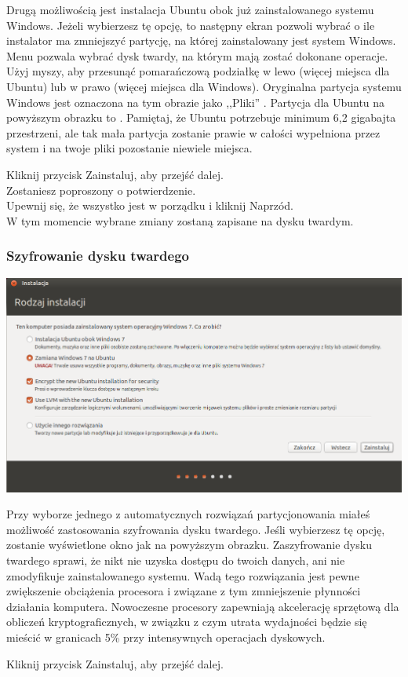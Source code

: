 Drugą możliwością jest instalacja Ubuntu obok już zainstalowanego systemu Windows. Jeżeli wybierzesz tę opcję, to następny ekran pozwoli wybrać o ile instalator ma zmniejszyć partycję, na której zainstalowany jest system Windows. Menu  pozwala wybrać dysk twardy, na którym mają zostać dokonane operacje. Użyj myszy, aby przesunąć pomarańczową podziałkę w lewo (więcej miejsca dla Ubuntu) lub w prawo (więcej miejsca dla Windows). Oryginalna partycja systemu Windows jest oznaczona na tym obrazie jako ,,Pliki'' . Partycja dla Ubuntu na powyższym obrazku to . Pamiętaj, że Ubuntu potrzebuje minimum 6,2 gigabajta przestrzeni, ale tak mała partycja zostanie prawie w całości wypełniona przez system i na twoje pliki pozostanie niewiele miejsca.
\begin{flushright}
Kliknij przycisk \textcolor{ubuntu_orange}{Zainstaluj}, aby przejść dalej.\\
Zostaniesz poproszony o potwierdzenie.\\
Upewnij się, że wszystko jest w porządku i kliknij \textcolor{ubuntu_orange}{Naprzód}.\\
W tym momencie wybrane zmiany zostaną zapisane na dysku twardym.
\end{flushright}

\subsubsection{Szyfrowanie dysku twardego}
\begin{center}
	\includegraphics[width=\linewidth]{images/instalator_partycjonowanie_szyfrowanie1.png}
\end{center}

Przy wyborze jednego z automatycznych rozwiązań partycjonowania miałeś możliwość zastosowania szyfrowania dysku twardego. Jeśli wybierzesz tę opcję, zostanie wyświetlone okno jak na powyższym obrazku. Zaszyfrowanie dysku twardego sprawi, że nikt nie uzyska dostępu do twoich danych, ani nie zmodyfikuje zainstalowanego systemu. Wadą tego rozwiązania jest pewne zwiększenie obciążenia procesora i związane z tym zmniejszenie płynności działania komputera. Nowoczesne procesory zapewniają akcelerację sprzętową dla obliczeń kryptograficznych, w związku z czym utrata wydajności będzie się mieścić w granicach 5\% przy intensywnych operacjach dyskowych.
\begin{flushright}
Kliknij przycisk \textcolor{ubuntu_orange}{Zainstaluj}, aby przejść dalej.
\end{flushright}


